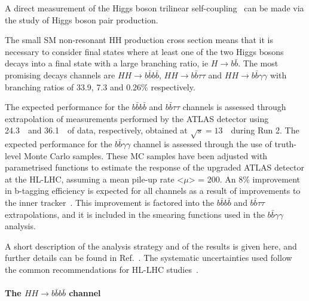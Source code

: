 A direct measurement of the Higgs boson trilinear self-coupling \lHHH\ can be made via the study of Higgs boson pair production. %

The small SM non-resonant HH production cross section means that it is necessary to consider final states where at least one of the two Higgs bosons decays into a final state with a large branching ratio, ie $H \rightarrow b\bar{b}$. The most promising decays channels are $HH \rightarrow b\bar{b}b\bar{b}$, $HH \rightarrow b\bar{b}\tau\tau$ and $HH \rightarrow b\bar{b}\gamma\gamma$ with branching ratios of 33.9, 7.3 and 0.26\% respectively.

The expected performance for the $b\bar{b}b\bar{b}$ and $b\bar{b}\tau\tau$ channels is assessed through extrapolation of measurements performed by the ATLAS detector using 24.3~\fbinv\ and 36.1~\fbinv\ of data, respectively, obtained at $\sqrt{s} = 13$~\TeV\ during Run 2.
The expected performance for the $b\bar{b}\gamma\gamma$ channel is assessed through the use of truth-level Monte Carlo samples. 
These MC samples have been adjusted with parametrised functions to estimate the response of the upgraded ATLAS detector at the HL-LHC, assuming a mean pile-up rate <$\mu$> = 200. 
An 8\% improvement in b-tagging efficiency is expected for all channels as a result of improvements to the inner tracker~\cite{ITKPixelTDR}.
This improvement is factored into the $b\bar{b}b\bar{b}$ and $b\bar{b}\tau\tau$ extrapolations, and it is included in the smearing functions used in the $b\bar{b}\gamma\gamma$ analysis.

A short description of the analysis strategy and of the results is given here, and further details can be found in Ref.~\cite{ATLASHHPUBnote}. The systematic uncertainties used follow the common recommendations for HL-LHC studies~\cite{ATLAS_PERF_Note}. 



%
\paragraph{The $HH \rightarrow b\bar{b}b\bar{b}$ channel}

